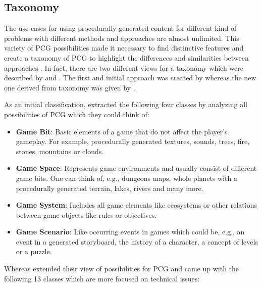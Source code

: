 \documentclass[MGS,Master,english]{twbook}%
\begin{document}
\subsection{Taxonomy}\label{PcgTaxonomy}
The use cases for using procedurally generated content for different kind of problems with different methods and approaches are almost unlimited. This variety of PCG possibilities made it necessary to find distinctive features and create a taxonomy of PCG to highlight the differences and similarities between approaches \cite{pcg::book}. In fact, there are two different views for a taxonomy which were described by \citep{pcg::survey} and \citep{pcg::book}. The first and initial approach was created by \citep{pcg::survey} whereas the new one derived from \citep{pcg::survey} taxonomy was given by \citep{pcg::book}.

As an initial classification, \citep{pcg::survey} extracted the following four classes by analyzing all possibilities of PCG which they could think of:
\begin{itemize}
	\item \textbf{Game Bit}: Basic elements of a game that do not affect the player's gameplay. For example, procedurally generated textures, sounds, trees, fire, stones, mountains or clouds. \cite{pcg::survey}
	\item \textbf{Game Space}: Represents game environments and usually consist of different game bits. One can think of, e.g., dungeons maps, whole planets with a procedurally generated terrain, lakes, rivers and many more. \cite{pcg::survey}
	\item \textbf{Game System}: Includes all game elements like ecosystems or other relations between game objects like rules or objectives. \cite{pcg::survey}
	\item \textbf{Game Scenario}: Like occurring events in games which could be, e.g., an event in a generated storyboard, the history of a character, a concept of levels or a puzzle. \cite{pcg::survey}
\end{itemize}
Whereas \citep{pcg::book} extended their view of possibilities for PCG and came up with the following 13 classes which are more focused on technical issues:
\end{document}
